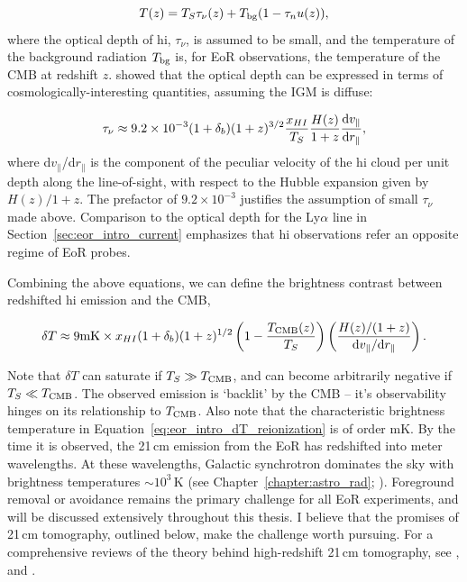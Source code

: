\begin{equation}
T(z) = T_S \tau_{\nu}(z) + T_{\rm bg}(1-\tau_nu(z)),
\label{eq:eor_intro_brightness_temp}
\end{equation}
where the optical depth of {\sc hi}, $\tau_{\nu}$, is assumed to be small, and the temperature of the background radiation $T_{\rm bg}$ is, for EoR observations, the temperature of the CMB at redshift $z$. \cite{Furlanetto.06} showed that the optical depth can be expressed in terms of cosmologically-interesting quantities, assuming the IGM is diffuse:

\begin{equation}
\tau_{\nu} \approx 9.2\times10^{-3} (1+\delta_b)(1+z)^{3/2}\frac{x_{HI}}{T_S}\frac{H(z)}{1+z}\frac{{\rm d}v_{\parallel}}{{\rm d}r_{\parallel}},
\end{equation}
where d$v_{\parallel}$/d$r_{\parallel}$ is the component of the peculiar velocity of the {\sc hi} cloud per unit depth along the line-of-sight, with respect to the Hubble expansion given by $H(z)/1+z$. The prefactor of $9.2\times10^{-3}$ justifies the assumption of small $\tau_{\nu}$ made above. Comparison to the optical depth for the Ly$\alpha$ line in Section~\ref{sec:eor_intro_current} emphasizes that {\sc hi} observations refer an opposite regime of EoR probes.

Combining the above equations, we can define the brightness contrast between redshifted {\sc hi} emission and the CMB,

\begin{equation}
\delta T \approx 9{\rm mK} \times x_{HI} (1+\delta_b)(1+z)^{1/2} \left( 1 - \frac{T_{\rm CMB}(z)}{T_S} \right)
\left( \frac{H(z)/(1+z)}{{\rm d}v_{\parallel}/{\rm d}r_{\parallel}} \right).
\label{eq:eor_intro_dT_reionization}
\end{equation}

Note that $\delta T$ can saturate if $T_S \gg T_{\rm CMB}$, and can become arbitrarily negative if $T_S \ll T_{\rm CMB}$. The observed emission is `backlit' by the CMB -- it's observability hinges on its relationship to $T_{\rm CMB}$.
Also note that the characteristic brightness temperature in Equation~\ref{eq:eor_intro_dT_reionization} is of order mK. By the time it is observed, the 21\,cm emission from the EoR has redshifted into meter wavelengths. At these wavelengths, Galactic synchrotron dominates the sky with brightness temperatures $\sim 10^3$\,K (see Chapter~\ref{chapter:astro_rad}; \citealt{McQuinn.07}). Foreground removal or avoidance remains the primary challenge for all EoR experiments, and will be discussed extensively throughout this thesis. I believe that the promises of 21\,cm tomography, outlined below, make the challenge worth pursuing. For a comprehensive reviews of the theory behind high-redshift 21\,cm tomography, see \cite{Madau.97}, \cite{Furlanetto.06} and \cite{Pritchard.10}. 

